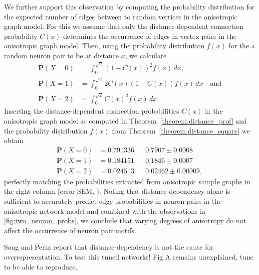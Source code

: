 We further support this observation by computing the probability
distribution for the expected number of edges between to random
vertices in the anisotropic graph model. For this we assume that only
the distance-dependent connection probability $C(x)$ determines the
occurrence of edges in vertex pairs in the anisotropic graph
model. Then, using the probability distribution $f(x)$ for the a
random neuron pair to be at distance $x$, we calculate
\begin{align*}
\mathbf{P}(X=0) & = \int_0^{\sqrt{2}} (1-C(x))^2 f(x)\,
dx, \\
\mathbf{P}(X=1) & = \int_0^{\sqrt{2}} 2 C(x) (1-C(x)) f(x) \, dx \quad \mathrm{and}\\
\mathbf{P}(X=2) & = \int_0^{\sqrt{2}} C(x)^2 f(x) \, dx. 
\end{align*}
Inserting the distance-dependent connection probabilities $C(x)$ in
the anisotropic graph model as computed in
Theorem~\ref{theorem:distance_prof} and the probability distribution
$f(x)$ from Theorem~\ref{theorem:distance_square} we obtain
\begin{align*} 
\mathbf{P}(X=0) & = 0.791336 && 0.7907  \pm 0.0008\\
\mathbf{P}(X=1) & = 0.184151 && 0.1846  \pm 0.0007\\
\mathbf{P}(X=2) & = 0.024513 && 0.02462  \pm 0.00009,
\end{align*}
perfectly matching the probabilities extracted from anisotropic sample
graphs in the right column (error SEM, ). Noting
that distance-dependency alone is sufficient to accurately predict
edge probabilities in neuron pairs in the anisotropic network model
and combined with the observations in \autoref{fig:two_neuron_probs},
we conclude that varying degrees of anisotropy do not affect the
occurrence of neuron pair motifs.






Song and Perin report that distance-dependency is not the cause for
overrepresentation. To test this tuned networks! Fig A remains
unexplained, tune to be able to reproduce.



